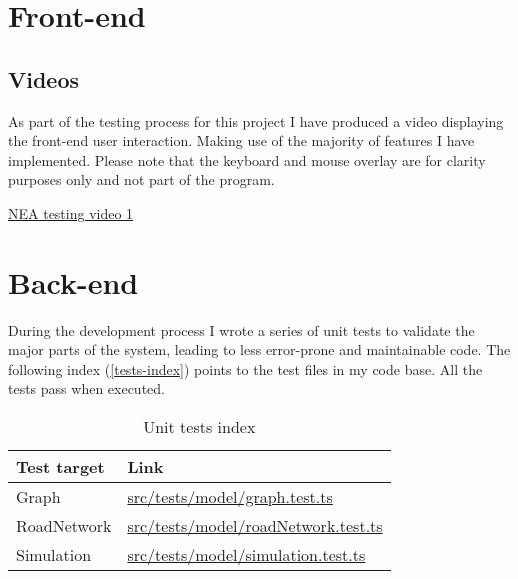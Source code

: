\section{Front-end}

    \subsection{Videos}

        As part of the testing process for this project I have produced a video displaying the front-end user interaction. Making use of the majority of features I have implemented. Please note that the keyboard and mouse overlay are for clarity purposes only and not part of the program.

        \href{https://youtu.be/RnU7ZQtnQWU}{NEA testing video 1}

\section{Back-end}

    During the development process I wrote a series of unit tests to validate the major parts of the system, leading to less error-prone and maintainable code. The following index (\autoref{tests-index}) points to the test files in my code base. All the tests pass when executed.

    \begin{table}
        \begin{tabular}{|p{}|p{}|}
            \hline
            \textbf{Test target} & \textbf{Link}\\\hline
            Graph & \href{https://github.com/joshua-smart/traffic-simulator/blob/main/src/tests/model/graph.test.ts}{src/tests/model/graph.test.ts}\\\hline
            RoadNetwork & \href{https://github.com/joshua-smart/traffic-simulator/blob/main/src/tests/model/roadNetwork.test.ts}{src/tests/model/roadNetwork.test.ts}\\\hline
            Simulation & \href{https://github.com/joshua-smart/traffic-simulator/blob/main/src/tests/model/simulation.test.ts}{src/tests/model/simulation.test.ts}\\\hline
        \end{tabular}
        \caption{Unit tests index}
        \label{tests-index}
    \end{table}
